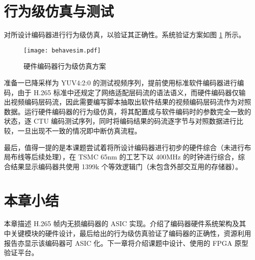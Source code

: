 \section{行为级仿真与测试}
对所设计编码器进行行为级仿真，以验证其正确性。系统验证方案如图 \ref{fig:behavesim} 所示。
\begin{figure}[hbt]
    \centering
    \texttt{[image: behavesim.pdf]}
    \caption{硬件编码器行为级仿真方案}
    \label{fig:behavesim}
\end{figure}
准备一已降采样为 YUV4:2:0 的测试视频序列，提前使用标准软件编码器进行编码，由于 H.265 标准中还规定了网络适配层码流的语法语义，而硬件编码器仅输出视频编码层码流，因此需要编写脚本抽取出软件结果的视频编码层码流作为对照数据。运行硬件编码器的行为级仿真，将其配置成与软件编码时的参数完全一致的状态，逐 CTU 编码测试序列，同时将编码结果的码流逐字节与对照数据进行比较，一旦出现不一致的情况即中断仿真流程。


最后，值得一提的是本课题尝试着将所设计编码器进行初步的硬件综合（未进行布局布线等后续处理），在 TSMC 65nm 的工艺下以 400MHz 的时钟进行综合，综合结果显示编码器共使用 1399k 个等效逻辑门（未包含外部交互用的存储器）。

\section{本章小结}
本章描述 H.265 帧内无损编码器的 ASIC 实现。介绍了编码器硬件系统架构及其中关键模块的硬件设计，最后给出的行为级仿真验证了编码器的正确性，资源利用报告亦显示该编码器可 ASIC 化。下一章将介绍课题中设计、使用的 FPGA 原型验证平台。